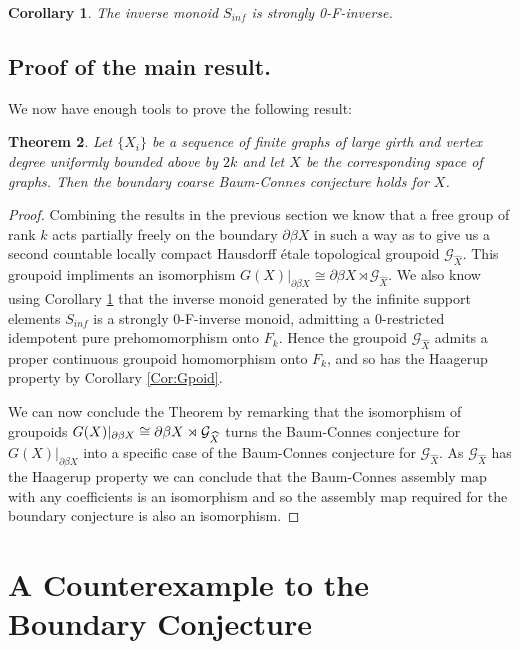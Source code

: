 \documentclass[11pt]{amsart}
\theoremstyle{plain}
\newtheorem{theorem}{Theorem}%
\newtheorem{corollary}[theorem]{Corollary}%
\theoremstyle{definition}%
\theoremstyle{remark}%
\newcommand{\G}{\mathcal{G}}
\begin{document}
\begin{corollary}\label{Cor:MT}
The inverse monoid $S_{inf}$ is strongly 0-F-inverse.
\end{corollary}

\subsection{Proof of the main result.}
We now have enough tools to prove the following result:
\begin{theorem}
Let $\lbrace X_{i} \rbrace$ be a sequence of finite graphs of large girth and vertex degree uniformly bounded above by $2k$ and let $X$ be the corresponding space of graphs. Then the boundary coarse Baum-Connes conjecture holds for $X$. 
\end{theorem}
\begin{proof}
Combining the results in the previous section we know that a free group of rank $k$ acts partially freely on the boundary $\partial\beta X$ in such a way as to give us a second countable locally compact Hausdorff \'etale topological groupoid $\G_{\widehat{X}}$. This groupoid impliments an isomorphism $G(X)|_{\partial\beta X} \cong \partial\beta X \rtimes \G_{\widehat{X}}$. We also know using Corollary \ref{Cor:MT} that the inverse monoid generated by the infinite support elements $S_{inf}$ is a strongly $0$-F-inverse monoid, admitting a $0$-restricted idempotent pure prehomomorphism onto $F_{k}$. Hence the groupoid $\G_{\widehat{X}}$ admits a proper continuous groupoid homomorphism onto $F_{k}$, and so has the Haagerup property by Corollary \ref{Cor:Gpoid}. 

We can now conclude the Theorem by remarking that the isomorphism of groupoids $G(X)|_{\partial\beta X} \\ \cong \partial\beta X \rtimes \G_{\widehat{X}}$ turns the Baum-Connes conjecture for $G(X)|_{\partial\beta X}$ into a specific case of the Baum-Connes conjecture for $\G_{\widehat{X}}$. As $\G_{\widehat{X}}$ has the Haagerup property we can conclude that the Baum-Connes assembly map with any coefficients is an isomorphism \cite{MR1798599} and so the assembly map required for the boundary conjecture is also an isomorphism.
\end{proof}


\section{A Counterexample to the Boundary Conjecture}
\end{document}
